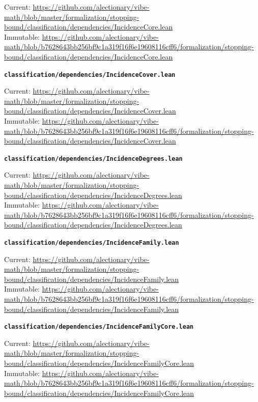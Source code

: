 {\footnotesize\noindent Current: \url{https://github.com/alectionary/vibe-math/blob/master/formalization/stopping-bound/classification/dependencies/IncidenceCore.lean}\\
Immutable: \url{https://github.com/alectionary/vibe-math/blob/b7628643bb256bf9c1a319f16f6e19608116cff6/formalization/stopping-bound/classification/dependencies/IncidenceCore.lean}\par}
\smallskip
\medskip
\par\noindent\textbf{\texttt{classification/dependencies/IncidenceCover.lean}}\par\nopagebreak
{\footnotesize\noindent Current: \url{https://github.com/alectionary/vibe-math/blob/master/formalization/stopping-bound/classification/dependencies/IncidenceCover.lean}\\
Immutable: \url{https://github.com/alectionary/vibe-math/blob/b7628643bb256bf9c1a319f16f6e19608116cff6/formalization/stopping-bound/classification/dependencies/IncidenceCover.lean}\par}
\smallskip
\medskip
\par\noindent\textbf{\texttt{classification/dependencies/IncidenceDegrees.lean}}\par\nopagebreak
{\footnotesize\noindent Current: \url{https://github.com/alectionary/vibe-math/blob/master/formalization/stopping-bound/classification/dependencies/IncidenceDegrees.lean}\\
Immutable: \url{https://github.com/alectionary/vibe-math/blob/b7628643bb256bf9c1a319f16f6e19608116cff6/formalization/stopping-bound/classification/dependencies/IncidenceDegrees.lean}\par}
\smallskip
\medskip
\par\noindent\textbf{\texttt{classification/dependencies/IncidenceFamily.lean}}\par\nopagebreak
{\footnotesize\noindent Current: \url{https://github.com/alectionary/vibe-math/blob/master/formalization/stopping-bound/classification/dependencies/IncidenceFamily.lean}\\
Immutable: \url{https://github.com/alectionary/vibe-math/blob/b7628643bb256bf9c1a319f16f6e19608116cff6/formalization/stopping-bound/classification/dependencies/IncidenceFamily.lean}\par}
\smallskip
\medskip
\par\noindent\textbf{\texttt{classification/dependencies/IncidenceFamilyCore.lean}}\par\nopagebreak
{\footnotesize\noindent Current: \url{https://github.com/alectionary/vibe-math/blob/master/formalization/stopping-bound/classification/dependencies/IncidenceFamilyCore.lean}\\
Immutable: \url{https://github.com/alectionary/vibe-math/blob/b7628643bb256bf9c1a319f16f6e19608116cff6/formalization/stopping-bound/classification/dependencies/IncidenceFamilyCore.lean}\par}
